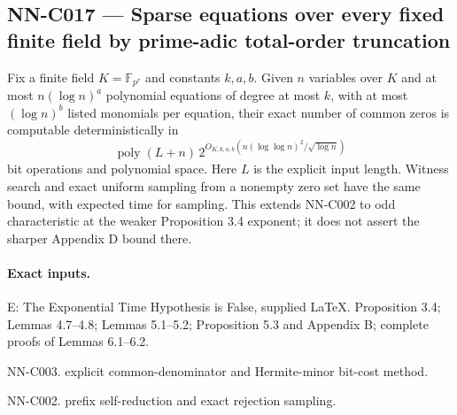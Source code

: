 \subsection{NN-C017 --- Sparse equations over every fixed finite field by prime-adic total-order truncation}
\begin{proposition}[NN-C017]
Fix a finite field $K=\mathbb F_{p^r}$ and constants $k,a,b$. Given $n$ variables over $K$ and at most $n(\log n)^a$ polynomial equations of degree at most $k$, with at most $(\log n)^b$ listed monomials per equation, their exact number of common zeros is computable deterministically in
\[
 \operatorname{poly}(L+n)\,
 2^{O_{K,k,a,b}(n(\log\log n)^2/\sqrt{\log n})}
\]
bit operations and polynomial space. Here $L$ is the explicit input length. Witness search and exact uniform sampling from a nonempty zero set have the same bound, with expected time for sampling. This extends NN-C002 to odd characteristic at the weaker Proposition 3.4 exponent; it does not assert the sharper Appendix D bound there.
\end{proposition}
\paragraph{Exact inputs.}
E: The Exponential Time Hypothesis is False, supplied LaTeX. Proposition 3.4; Lemmas 4.7--4.8; Lemmas 5.1--5.2; Proposition 5.3 and Appendix B; complete proofs of Lemmas 6.1--6.2.

NN-C003. explicit common-denominator and Hermite-minor bit-cost method.

NN-C002. prefix self-reduction and exact rejection sampling.

